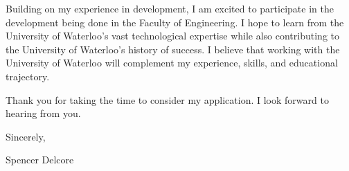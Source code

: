 \documentclass{resume}
\begin{document}
\hspace{36pt}
Building on my experience in development, I am excited to participate in the development being done in the Faculty of Engineering. I hope to learn from the University of Waterloo's vast technological expertise while also contributing to the University of Waterloo's history of success. I believe that working with the University of Waterloo will complement my experience, skills, and educational trajectory.

\hspace{36pt}
Thank you for taking the time to consider my application. I look forward to hearing from you.

Sincerely,

Spencer Delcore
\end{document}
